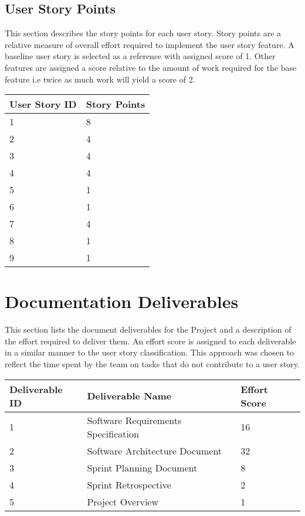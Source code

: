 \documentclass[11pt]{article}
\begin{document}
\subsection{User Story Points}
This section describes the story points for each user story. Story points are a relative measure of overall effort required to implement the user story feature. A baseline user story is selected as a reference with assigned score of 1. Other features are assigned a score relative to the amount of work required for the base feature i.e twice as much work will yield a score of 2.

\begin{table}[H]
	\begin{tabular}{@{}|l||l|@{}}
		\toprule
			\textbf{User Story ID}          & \textbf{Story Points }         \\ \midrule
		1 & 8	\\ \midrule
		2 & 4	\\ \midrule
	    3 & 4	\\ \midrule
		4 & 4	\\ \midrule
		5 & 1	\\ \midrule
		6 & 1	\\ \midrule
		7 & 4	\\ \midrule
		8 & 1	\\ \midrule
		9 & 1	\\ \bottomrule
	\end{tabular}
\end{table}

\section{Documentation Deliverables}
This section lists the document deliverables for the Project and a description of the effort required to deliver them. An effort score is assigned to each deliverable in a similar manner to the user story classification. This approach was chosen to reflect the time spent by the team on tasks that do not contribute to a user story.

\begin{table}[H]
	\begin{tabular}{@{}|l|l|l|@{}}
		\toprule
Deliverable ID	&	Deliverable  Name                   & Effort Score \\ \midrule
1	&	Software Requirements Specification & 16           \\ \midrule
2	&	Software Architecture Document      & 32           \\ \midrule
3	&	Sprint Planning Document            & 8            \\ \midrule
4	&	Sprint Retrospective                & 2            \\ \midrule
5 & Project Overview			&1							\\ \bottomrule
	\end{tabular}
\end{table}
\end{document}
